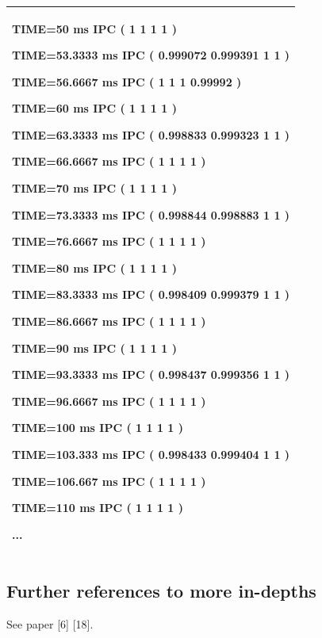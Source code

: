 \documentclass[a4paper]{article}
\begin{document}
\begin{flushleft}
\begin{tiny}
\begin{supertabular}{|m{6.34626in}|}
{\ttfamily TIME=50 ms IPC ( 1 1 1 1
)}

{\ttfamily TIME=53.3333 ms IPC (
0.999072 0.999391 1 1 )}

{\ttfamily TIME=56.6667 ms IPC ( 1
1 1 0.99992 )}

{\ttfamily TIME=60 ms IPC ( 1 1 1 1
)}

{\ttfamily TIME=63.3333 ms IPC (
0.998833 0.999323 1 1 )}

{\ttfamily TIME=66.6667 ms IPC ( 1
1 1 1 )}

{\ttfamily TIME=70 ms IPC ( 1 1 1 1
)}

{\ttfamily TIME=73.3333 ms IPC (
0.998844 0.998883 1 1 )}

{\ttfamily TIME=76.6667 ms IPC ( 1
1 1 1 )}

{\ttfamily TIME=80 ms IPC ( 1 1 1 1
)}

{\ttfamily TIME=83.3333 ms IPC (
0.998409 0.999379 1 1 )}

{\ttfamily TIME=86.6667 ms IPC ( 1
1 1 1 )}

{\ttfamily TIME=90 ms IPC ( 1 1 1 1
)}

{\ttfamily TIME=93.3333 ms IPC (
0.998437 0.999356 1 1 )}

{\ttfamily TIME=96.6667 ms IPC ( 1
1 1 1 )}

{\ttfamily TIME=100 ms IPC ( 1 1 1
1 )}

{\ttfamily TIME=103.333 ms IPC (
0.998433 0.999404 1 1 )}

{\ttfamily TIME=106.667 ms IPC ( 1
1 1 1 )}

{\ttfamily TIME=110 ms IPC ( 1 1 1
1 )}

\ttfamily ...\\\hline
\end{supertabular}
\end{tiny}
\end{flushleft}

\bigskip

\subsection[Further references to more in{}-depths]{Further references
to more in-depths}
{
See paper [6] [18].}
\end{document}
